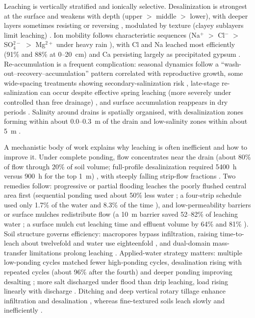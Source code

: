 \documentclass[11pt]{article}
\begin{document}
Leaching is vertically stratified and ionically selective. Desalinization is
strongest at the surface and weakens with depth (upper $>$ middle $>$ lower), with
deeper layers sometimes resisting or reversing
\parencite{Chen2022,Han2023,Narjary2024,Tian2024}, modulated by texture
(clayey sublayers limit leaching) \parencite{Qin2025}. Ion mobility follows
characteristic sequences (Na$^+$ $>$ Cl$^-$ $>$ SO$_4^{2-}$ $>$ Mg$^{2+}$ under
heavy rain \parencite{Yu2016}), with Cl and Na leached most efficiently
(91\% and 88\% at 0--20~cm) and Ca persisting largely as precipitated gypsum
\parencite{Qian2025,Sharma2000}. Re-accumulation is a frequent complication:
seasonal dynamics follow a ``wash-out--recovery--accumulation'' pattern
correlated with reproductive growth, some wide-spacing treatments showing
secondary-salinization risk \parencite{Zhu2025b}, late-stage re-salinization can
occur despite effective spring leaching (more severely under controlled than free
drainage) \parencite{Dou2022}, and surface accumulation reappears in dry periods
\parencite{Yu2016,Shi2021b}. Salinity around drains is spatially organised, with
desalinization zones forming within about 0.0--0.3~m of the drain and low-salinity
zones within about 5~m
\parencite{Lu2019,Heng2021,Han2023,Mirlas2003,Benyamini2005}.

A mechanistic body of work explains why leaching is often inefficient and how to
improve it. Under complete ponding, flow concentrates near the drain (about 80\%
of flow through 20\% of soil volume; full-profile desalinization required 5400~h
versus 900~h for the top 1~m) \parencite{RAO1991}, with steeply falling
strip-flow fractions \parencite{Youngs2000}. Two remedies follow: progressive or
partial flooding leaches the poorly flushed central area first (sequential
ponding used about 50\% less water \parencite{RAO1991}; a four-strip schedule used
only 1.7\% of the water and 8.3\% of the time \parencite{Youngs2000}), and
low-permeability barriers or surface mulches redistribute flow (a 10~m barrier
saved 52--82\% of leaching water \parencite{Yu2018}; a surface mulch cut leaching
time and effluent volume by 64\% and 81\% \parencite{Zhang2022}). Soil structure
governs efficiency: macropores bypass infiltration, raising time-to-leach about
twelvefold and water use eighteenfold \parencite{Xin2016}, and dual-domain
mass-transfer limitations prolong leaching \parencite{Zhang2024}. Applied-water
strategy matters: multiple low-ponding cycles matched fewer high-ponding cycles,
desalination rising with repeated cycles (about 96\% after the fourth) and
deeper ponding improving desalting \parencite{Jia2023}; more salt discharged
under flood than drip leaching, load rising linearly with discharge
\parencite{Li2022}. Ditching and deep vertical rotary tillage enhance
infiltration and desalination \parencite{Tian2023,Li2026}, whereas fine-textured
soils leach slowly and inefficiently \parencite{MANN1982}.
\end{document}

